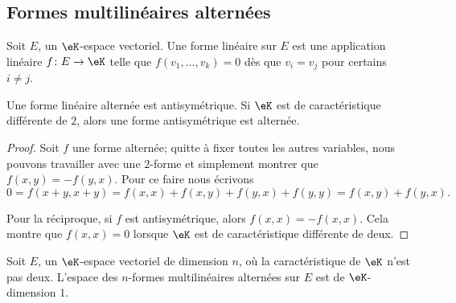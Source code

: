 \subsection{Formes multilinéaires alternées}


\begin{definition}
    Soit \( E\), un \( \eK\)-espace vectoriel. Une forme linéaire  sur \( E\) est une application linéaire \( f\colon E\to \eK\) telle que \( f(v_1,\ldots, v_k)=0\) dès que \( v_i=v_j\) pour certains \( i\neq j\).
\end{definition}

\begin{lemma}   \label{LemHiHNey}
    Une forme linéaire alternée est antisymétrique. Si \( \eK\) est de caractéristique différente de \( 2\), alors une forme antisymétrique est alternée.
\end{lemma}

\begin{proof}
    Soit \( f\) une forme alternée; quitte à fixer toutes les autres variables, nous pouvons travailler avec une \( 2\)-forme et simplement montrer que \( f(x,y)=-f(y,x)\). Pour ce faire nous écrivons
    \begin{equation}
        0=f(x+y,x+y)=f(x,x)+f(x,y)+f(y,x)+f(y,y)=f(x,y)+f(y,x).
    \end{equation}
    
    Pour la réciproque, si \( f\) est antisymétrique, alors \( f(x,x)=-f(x,x)\). Cela montre que \( f(x,x)=0\) lorsque \( \eK\) est de caractéristique différente de deux.
\end{proof}

\begin{proposition} \label{ProprbjihK}
    Soit \( E\), un \( \eK\)-espace vectoriel de dimension \( n\), où la caractéristique de \( \eK\) n'est pas deux. L'espace des \( n\)-formes multilinéaires alternées sur \( E\) est de \( \eK\)-dimension \( 1\).
\end{proposition}


